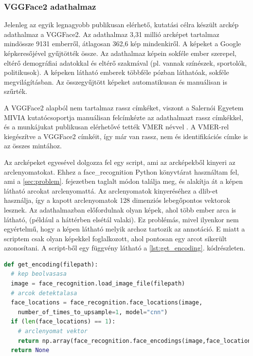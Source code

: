 \subsubsection*{VGGFace2 adathalmaz}

Jelenleg az egyik legnagyobb publikusan elérhető, kutatási célra készült arckép adathalmaz a VGGFace2. Az adathalmaz 3,31 millió arcképet tartalmaz mindössze 9131 emberről, átlagosan 362,6 kép mindenkiről. A képeket a Google képkeresőjével gyűjtötték össze. Az adathalmaz képein sokféle ember szerepel, eltérő demográfiai adatokkal és eltérő szakmával (pl. vannak színészek, sportolók, politikusok). A képeken látható emberek többféle pózban láthatóak, sokféle megvilágításban. Az összegyűjtött képeket automatikusan és manuálisan is szűrték.

A VGGFace2 alapból nem tartalmaz rassz címkéket, viszont a Salernói Egyetem MIVIA kutatócsoportja manuálisan felcímkézte az adathalmazt rassz címkékkel, és a munkájukat publikusan elérhetővé tették VMER névvel \cite{vmer2020}. A VMER-rel kiegészítve a VGGFace2 címkéit, így már van rassz, nem és identifikációs címke is az összes mintához.

Az arcképeket egyesével dolgozza fel egy script, ami az arcképekből kinyeri az arclenyomatokat. Ehhez a face\_recognition Python könyvtárat \cite{face_recognition} használtam fel, ami a \ref{sec:problem}. fejezetben taglalt módon találja meg, és alakítja át a képen látható arcokat arclenyomattá. Az arclenyomatok kinyeréséhez a dlib-et \cite{dlib2009} használja, így a kapott arclenyomatok 128 dimenziós lebegőpontos vektorok lesznek. Az adathalmazban előfordulnak olyan képek, ahol több ember arca is látható, (például a háttérben elsétál valaki). Ez problémás, mivel ilyenkor nem egyértelmű, hogy a képen látható melyik archoz tartozik az annotáció. E miatt a scriptem csak olyan képekkel foglalkozott, ahol pontosan egy arcot sikerült azonosítani. A script-ből egy függvény látható a \ref{lst:get_encoding}. kódrészleten.

\begin{lstlisting}[language=python, caption={Arclenyomat vektorok kinyerése.}, label=lst:get_encoding]
def get_encoding(filepath):
  # kep beolvasasa
  image = face_recognition.load_image_file(filepath) 
  # arcok detektalasa 
  face_locations = face_recognition.face_locations(image,
    number_of_times_to_upsample=1, model="cnn")
  if (len(face_locations) == 1): 
    # arclenyomat vektor
    return np.array(face_recognition.face_encodings(image,face_locations))[1]
  return None
\end{lstlisting}


